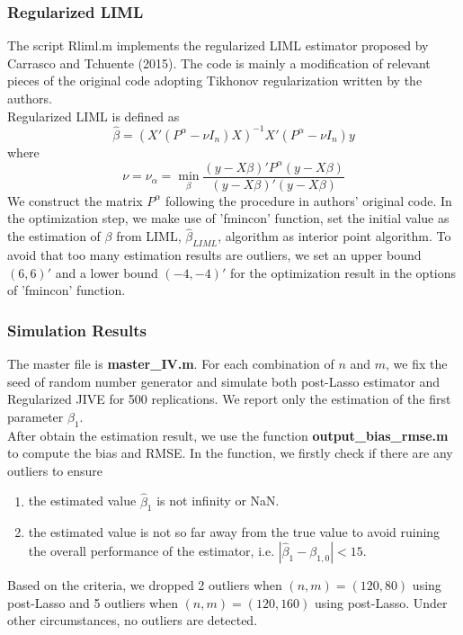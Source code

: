 \documentclass[12pt, a4paper]{article}
\begin{document}
\subsubsection*{Regularized LIML}

The script Rliml.m implements the regularized LIML estimator proposed by Carrasco and Tchuente (2015). The code is mainly a modification of relevant pieces of the original code adopting Tikhonov regularization written by the authors\cite{rliml}.\\
\noindent Regularized LIML is defined as 
\begin{equation}
\hat{\beta} = (X'(P^\alpha - \nu I_n)X)^{-1}X'(P^\alpha - \nu I_n)y
\end{equation}
where
\begin{equation}
\nu = \nu_\alpha = \min\limits_{\beta} \frac{(y-X\beta)'P^\alpha(y-X\beta)}{(y-X\beta)'(y-X\beta)}
\end{equation}
We construct the matrix $P^\alpha$ following the procedure in authors' original code. In the optimization step, we make use of 'fmincon' function, set the initial value as the estimation of $\beta$ from LIML, $\hat{\beta}_{LIML}$, algorithm as interior point algorithm. To avoid that too many estimation results are outliers, we set an upper bound $(6,6)'$ and a lower bound $(-4,-4)'$ for the optimization result in the options of 'fmincon' function.


\subsubsection*{Simulation Results}
The master file is \textbf{master\_IV.m}. For each combination of $n$ and $m$, we fix the seed of random number generator and simulate both post-Lasso estimator and Regularized JIVE for 500 replications. We report only the estimation of the first parameter $\beta_1$.\\
\noindent After obtain the estimation result, we use the function \textbf{output\_bias\_rmse.m} to compute the bias and RMSE. In the function, we firstly check if there are any outliers to ensure
\begin{enumerate}
	\item the estimated value $\hat{\beta}_1$ is not infinity or NaN.
	\item the estimated value is not so far away from the true value to avoid ruining the overall performance of the estimator, i.e. $ |\hat{\beta}_1 - \beta_{1,0} | < 15$.
\end{enumerate}
Based on the criteria, we dropped 2 outliers when $(n,m) = (120,80)$ using post-Lasso and 5 outliers when $(n,m) = (120,160)$ using post-Lasso. Under other circumstances, no outliers are detected.\\
\end{document}
